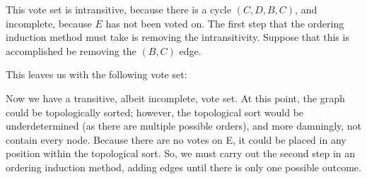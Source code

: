 \documentclass{article}
\begin{document}
This vote set is intransitive, because there is a cycle $(C, D, B, C)$, and incomplete, because $E$ has not been voted on. The first step that the ordering induction method must take is removing the intransitivity. Suppose that this is accomplished be removing the $(B,C)$ edge.

\begin{center}
\end{center}

This leaves us with the following vote set:
\begin{center}
\end{center}

Now we have a transitive, albeit incomplete, vote set. At this point, the graph could be topologically sorted; however, the topological sort would be underdetermined (as there are multiple possible orders), and more damningly, not contain every node. Because there are no votes on E, it could be placed in any position within the topological sort. So, we must carry out the second step in an ordering induction method, adding edges until there is only one possible outcome.
\end{document}
